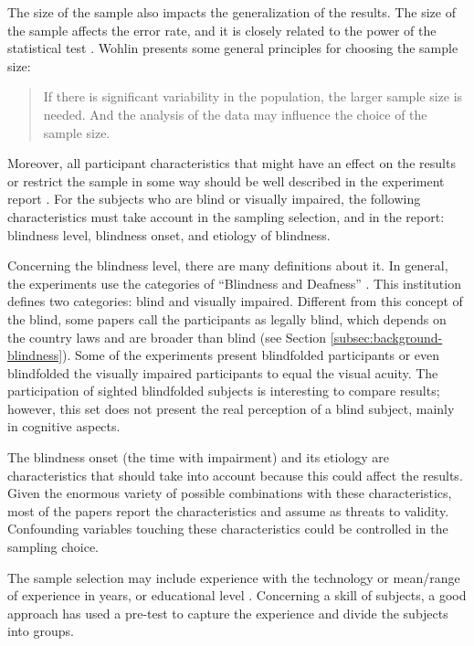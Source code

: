 The size of the sample also impacts the generalization of the results. The size of the sample affects the error rate, and it is closely related to the power of the statistical test \cite{Wohlin2000}. Wohlin presents some general principles for choosing the sample size:

\begin{quotation}
     If there is significant variability in the population, the larger sample size is needed. And the analysis of the data may influence the choice of the sample size.
\end{quotation}

Moreover, all participant characteristics that might have an effect on the results or restrict the sample in some way should be well described in the experiment report \cite{Jedlitschka2007}. For the subjects who are blind or visually impaired, the following characteristics must take account in the sampling selection, and in the report: blindness level, blindness onset, and etiology of blindness.

Concerning the blindness level, there are many definitions about it. In general, the experiments use the categories of ``Blindness and Deafness'' \cite{WHO2018Blindness}. This institution defines two categories: blind and visually impaired. Different from this concept of the blind, some papers call the participants as legally blind, which depends on the country laws and are broader than blind (see Section \ref{subsec:background-blindness}). Some of the experiments present blindfolded participants or even blindfolded the visually impaired participants to equal the visual acuity. The participation of sighted blindfolded subjects is interesting to compare results; however, this set does not present the real perception of a blind subject, mainly in cognitive aspects.

The blindness onset (the time with impairment) and its etiology are characteristics that should take into account because this could affect the results.  Given the enormous variety of possible combinations with these characteristics, most of the papers report the characteristics and assume as threats to validity. Confounding variables touching these characteristics could be controlled in the sampling choice.

The sample selection may include experience with the technology or mean/range of experience in years, or educational level \cite{Shull2008GuideEngineering}. Concerning a skill of subjects, a good approach has used a pre-test to capture the experience and divide the subjects into groups. 

